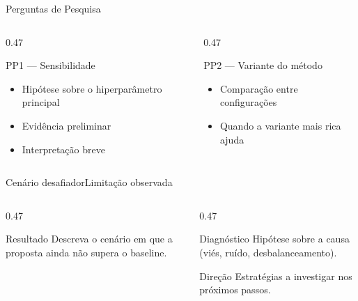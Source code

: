 \documentclass[aspectratio=169, 10pt, brazil]{beamer}
\begin{document}
\begin{frame}{Perguntas de Pesquisa}
  \begin{columns}[T,onlytextwidth]
    \begin{column}{0.47\textwidth}
      \begin{block}{PP1 — Sensibilidade}
        \begin{itemize}
          \item Hipótese sobre o hiperparâmetro principal
          \item Evidência preliminar
          \item Interpretação breve
        \end{itemize}
      \end{block}
    \end{column}
    \begin{column}{0.47\textwidth}
      \begin{block}{PP2 — Variante do método}
        \begin{itemize}
          \item Comparação entre configurações
          \item Quando a variante mais rica ajuda
        \end{itemize}
      \end{block}
    \end{column}
  \end{columns}
\end{frame}

\begin{frame}{Cenário desafiador}{Limitação observada}
  \begin{columns}[T,onlytextwidth]
    \begin{column}{0.47\textwidth}
      \begin{alerta}{Resultado}
        Descreva o cenário em que a proposta ainda
        não supera o baseline.
      \end{alerta}
    \end{column}
    \begin{column}{0.47\textwidth}
      \begin{block}{Diagnóstico}
        Hipótese sobre a causa (viés, ruído, desbalanceamento).
      \end{block}
      \begin{destaque}{Direção}
        Estratégias a investigar nos próximos passos.
      \end{destaque}
    \end{column}
  \end{columns}
\end{frame}
\end{document}
